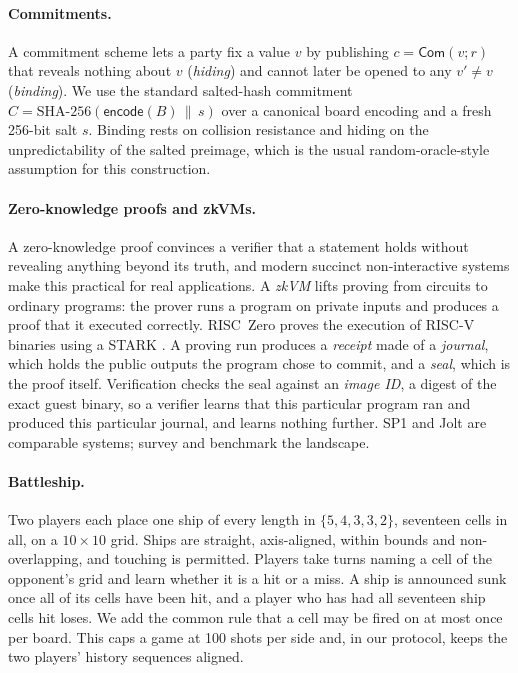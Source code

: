 \documentclass[11pt,a4paper]{article}
\newcommand{\C}{\ensuremath{C}}
\begin{document}
\paragraph{Commitments.}
A commitment scheme lets a party fix a value $v$ by publishing $c =
\mathsf{Com}(v; r)$ that reveals nothing about $v$ (\emph{hiding}) and cannot
later be opened to any $v' \neq v$ (\emph{binding}). We use the standard
salted-hash commitment $\C = \mathrm{SHA\mbox{-}256}(\mathsf{encode}(B) \,\|\, s)$
over a canonical board encoding and a fresh 256-bit salt $s$. Binding rests on
collision resistance and hiding on the unpredictability of the salted preimage,
which is the usual random-oracle-style assumption for this construction.

\paragraph{Zero-knowledge proofs and zkVMs.}
A zero-knowledge proof \cite{gmr} convinces a verifier that a statement holds
without revealing anything beyond its truth, and modern succinct
non-interactive systems \cite{groth16,starks} make this practical for real
applications. A \emph{zkVM} lifts proving from circuits to ordinary programs:
the prover runs a program on private inputs and produces a proof that it
executed correctly. RISC~Zero \cite{risc0} proves the execution of RISC-V
binaries using a STARK \cite{starks}. A proving run produces a \emph{receipt}
made of a \emph{journal}, which holds the public outputs the program chose to
commit, and a \emph{seal}, which is the proof itself. Verification checks the
seal against an \emph{image ID}, a digest of the exact guest binary, so a
verifier learns that this particular program ran and produced this particular
journal, and learns nothing further. SP1 \cite{sp1} and Jolt \cite{jolt} are
comparable systems; \cite{zkpsurvey,zkvmcompilers} survey and benchmark the
landscape.

\paragraph{Battleship.}
Two players each place one ship of every length in $\{5,4,3,3,2\}$, seventeen
cells in all, on a $10\times10$ grid. Ships are straight, axis-aligned, within
bounds and non-overlapping, and touching is permitted. Players take turns
naming a cell of the opponent's grid and learn whether it is a hit or a miss. A
ship is announced sunk once all of its cells have been hit, and a player who
has had all seventeen ship cells hit loses. We add the common rule that a cell
may be fired on at most once per board. This caps a game at 100 shots per side
and, in our protocol, keeps the two players' history sequences aligned.
\end{document}
